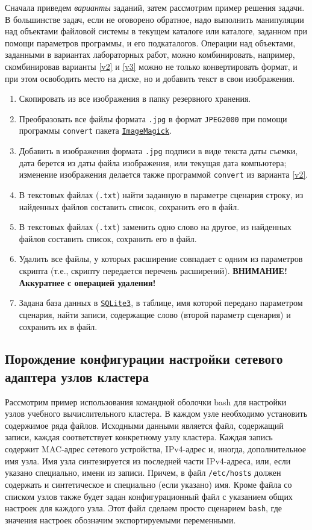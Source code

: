 \documentclass[12pt]{article}
\begin{document}
Сначала приведем \emph{варианты} заданий, затем рассмотрим пример решения задачи. В большинстве задач, если не оговорено обратное, надо выполнить манипуляции над объектами файловой системы в текущем каталоге или каталоге, заданном при помощи параметров программы, и его подкаталогов. Операции над объектами, заданными в вариантах лабораторных работ, можно комбинировать, например, скомбинировав варианты \ref{v2} и \ref{v3} можно не только конвертировать формат, и при этом освободить место на диске, но и добавить текст в свои изображения.
\begin{enumerate}
\item Скопировать из все изображения в папку резервного хранения.
\item Преобразовать все файлы формата \texttt{.jpg} в формат \texttt{JPEG2000} при помощи программы \texttt{convert} пакета \href{https://imagemagick.org/index.php}{\texttt{ImageMagick}}. \label{v2}
\item \label{v3} Добавить в изображения формата \texttt{.jpg} подписи в виде текста даты съемки, дата берется из даты файла изображения, или текущая дата компьютера; изменение изображения делается также программой \texttt{convert} из варианта \ref{v2}.
\item В текстовых файлах (\texttt{.txt}) найти заданную в параметре сценария строку, из найденных файлов составить список, сохранить его в файл.
\item В текстовых файлах (\texttt{.txt}) заменить одно слово на другое, из найденных файлов составить список, сохранить его в файл.
\item Удалить все файлы, у которых расширение совпадает с одним из параметров скрипта (т.е., скрипту передается перечень расширений). \textbf{ВНИМАНИЕ! Аккуратнее с операцией удаления!}
\item Задана база данных в \href{https://www.sqlite.org/index.html}{\texttt{SQLite3}}, в таблице, имя которой передано параметром сценария, найти записи, содержащие слово (второй параметр сценария) и сохранить их в файл.
\end{enumerate}


\subsection{Порождение конфигурации настройки сетевого адаптера узлов кластера}

Рассмотрим пример использования командной оболочки bash для настройки узлов учебного вычислительного кластера. В каждом узле необходимо установить содержимое ряда файлов. Исходными данными является файл, содержащий записи, каждая соответствует конкретному узлу кластера. Каждая запись содержит MAC-адрес сетевого устройства, IPv4-адрес и, иногда, дополнительное имя узла. Имя узла синтезируется из последней части IPv4-адреса, или, если указано специально, имени из записи. Причем, в файл \texttt{/etc/hosts} должен содержать и синтетическое и специально (если указано) имя. Кроме файла со списком узлов также будет задан конфигурационный файл с указанием общих настроек для каждого узла. Этот файл сделаем просто сценарием \texttt{bash}, где значения настроек обозначим экспортируемыми переменными.
\end{document}

